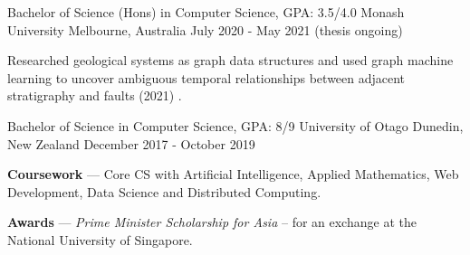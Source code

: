 
\begin{cventries}
  \cventry
    {Bachelor of Science (Hons) in Computer Science, GPA: 3.5/4.0} %
    {Monash University} %
    {Melbourne, Australia} %
    {July 2020 - May 2021 (thesis ongoing)} %
    {
      \begin{cvitems} %
         \item {Researched geological systems as graph data structures and used graph machine learning to uncover ambiguous temporal relationships between adjacent stratigraphy and faults (2021) .}
      \end{cvitems}
    }

  \cventry
    {Bachelor of Science in Computer Science, GPA: 8/9} %
    {University of Otago} %
    {Dunedin, New Zealand} %
    {December 2017 - October 2019} %
    {
      \begin{cvitems} %
         \item {\textbf{Coursework} --- Core CS with Artificial Intelligence, Applied Mathematics, Web Development, Data Science and Distributed Computing.}
         \item {\textbf{Awards} --- \emph{Prime Minister Scholarship for Asia} -- for an exchange at the National University of Singapore. }
      \end{cvitems}
    }
\end{cventries}
